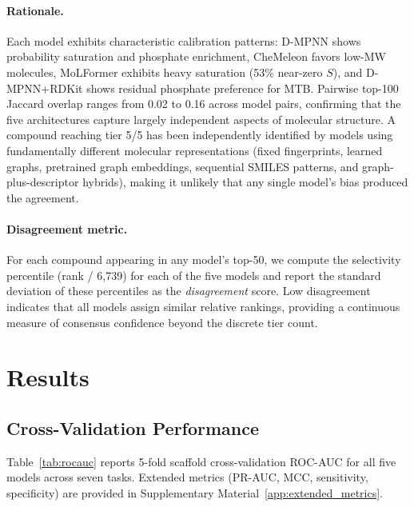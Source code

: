 \documentclass{article}
\begin{document}
\paragraph{Rationale.}
Each model exhibits characteristic calibration patterns: D-MPNN shows probability saturation and phosphate enrichment, CheMeleon favors low-MW molecules, MoLFormer exhibits heavy saturation (53\% near-zero $S$), and D-MPNN+RDKit shows residual phosphate preference for MTB.
Pairwise top-100 Jaccard overlap ranges from 0.02 to 0.16 across model pairs, confirming that the five architectures capture largely independent aspects of molecular structure.
A compound reaching tier 5/5 has been independently identified by models using fundamentally different molecular representations (fixed fingerprints, learned graphs, pretrained graph embeddings, sequential SMILES patterns, and graph-plus-descriptor hybrids), making it unlikely that any single model's bias produced the agreement.

\paragraph{Disagreement metric.}
For each compound appearing in any model's top-50, we compute the selectivity percentile (rank / 6,739) for each of the five models and report the standard deviation of these percentiles as the \emph{disagreement} score.
Low disagreement indicates that all models assign similar relative rankings, providing a continuous measure of consensus confidence beyond the discrete tier count.



\section{Results}
\label{sec:results}

\subsection{Cross-Validation Performance}
\label{sec:cv}

Table~\ref{tab:rocauc} reports 5-fold scaffold cross-validation ROC-AUC for all five models across seven tasks.
Extended metrics (PR-AUC, MCC, sensitivity, specificity) are provided in Supplementary Material~\ref{app:extended_metrics}.
\end{document}
